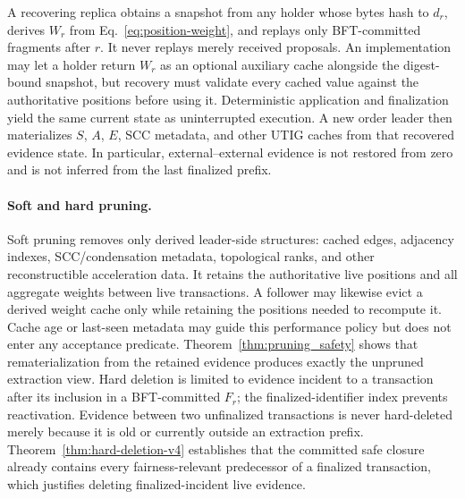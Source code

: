 A recovering replica obtains a snapshot from any holder whose bytes hash to
$d_r$, derives $W_r$ from Eq.~\eqref{eq:position-weight}, and replays only
BFT-committed fragments after $r$.  It never replays merely received
proposals.  An implementation may let a holder return $W_r$ as an optional
auxiliary cache alongside the digest-bound snapshot, but recovery must
validate every cached value against the authoritative positions before using
it.  Deterministic application and
finalization yield the same current state as uninterrupted execution.  A new
order leader then
materializes $S$, $A$, $E$, SCC metadata, and other UTIG caches from that
recovered evidence state.  In particular, external--external evidence is not
restored from zero and is not inferred from the last finalized prefix.

\paragraph{Soft and hard pruning.}
Soft pruning removes only derived leader-side structures: cached edges,
adjacency indexes, SCC/condensation metadata, topological ranks, and other
reconstructible acceleration data.  It retains the authoritative live
positions and all aggregate weights between live transactions.  A follower may
likewise evict a derived weight cache only while retaining the positions needed
to recompute it.  Cache age or last-seen metadata may guide this performance
policy but does not enter any acceptance predicate.
Theorem~\ref{thm:pruning_safety} shows that rematerialization from the retained
evidence produces exactly the unpruned extraction view.  Hard deletion is
limited to evidence incident to a transaction after its inclusion in a
BFT-committed $F_r$; the finalized-identifier index prevents reactivation.
Evidence between two unfinalized transactions is never hard-deleted merely
because it is old or currently outside an extraction prefix.
Theorem~\ref{thm:hard-deletion-v4} establishes that the committed safe closure
already contains every fairness-relevant predecessor of a finalized
transaction, which justifies deleting finalized-incident live evidence.

